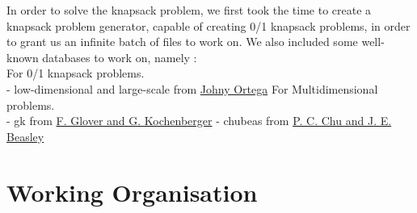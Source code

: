 \documentclass[a4paper, 11pt]{article}
\begin{document}
In order to solve the knapsack problem, we first took the time to create a knapsack problem generator, capable of creating 0/1 knapsack problems, in order to grant us an infinite batch of files to work on. We also included some well-known databases to work on, namely :\\
\tabto{1.5cm} For 0/1 knapsack problems.\\
\tabto{2.5cm} - low-dimensional and large-scale from \href{http://artemisa.unicauca.edu.co/~johnyortega/instances_01_KP/}{Johny Ortega}
\tabto{1.5cm} For Multidimensional problems.\\
\tabto{2.5cm} - gk from \href{https://www.researchgate.net/publication/271198281_Benchmark_instances_for_the_Multidimensional_Knapsack_Problem}{F. Glover and G. Kochenberger}
\tabto{2.5cm} - chubeas from \href{https://www.researchgate.net/publication/271198281_Benchmark_instances_for_the_Multidimensional_Knapsack_Problem}{P. C. Chu and J. E. Beasley}

\newpage

\section{Working Organisation}
\end{document}
